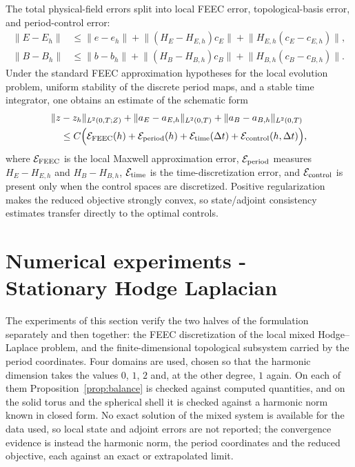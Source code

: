 \documentclass{article}
\newcommand{\norm}[1]{\lVert #1\rVert}
\begin{document}
The total physical-field errors split into local FEEC error, topological-basis error, and period-control error:
\begin{align}
  \norm{E-E_h}
  &\le \norm{e-e_h}
  +\norm{(H_E-H_{E,h})c_E}
  +\norm{H_{E,h}(c_E-c_{E,h})},
  \\
  \norm{B-B_h}
  &\le \norm{b-b_h}
  +\norm{(H_B-H_{B,h})c_B}
  +\norm{H_{B,h}(c_B-c_{B,h})}.
\end{align}
Under the standard FEEC approximation hypotheses for the local evolution problem, uniform stability of the discrete period maps, and a stable time integrator, one obtains an estimate of the schematic form
\begin{equation}
\begin{aligned}
 &\norm{z-z_h}_{L^2(0,T;Z)}
 +\norm{a_E-a_{E,h}}_{L^2(0,T)}
 +\norm{a_B-a_{B,h}}_{L^2(0,T)}\\
 &\quad\le C\Big(
   \mathcal E_{\rm FEEC}(h)
  +\mathcal E_{\rm period}(h)
  +\mathcal E_{\rm time}(\Delta t)
  +\mathcal E_{\rm control}(h,\Delta t)
 \Big),
\end{aligned}
\end{equation}
where $\mathcal E_{\rm FEEC}$ is the local Maxwell approximation error, $\mathcal E_{\rm period}$ measures $H_E-H_{E,h}$ and $H_B-H_{B,h}$, $\mathcal E_{\rm time}$ is the time-discretization error, and $\mathcal E_{\rm control}$ is present only when the control spaces are discretized.  Positive regularization makes the reduced objective strongly convex, so state/adjoint consistency estimates transfer directly to the optimal controls.

\section{Numerical experiments - Stationary Hodge Laplacian}\label{sec:numerics}

The experiments of this section verify the two halves of the formulation
separately and then together: the FEEC discretization of the local mixed
Hodge--Laplace problem, and the finite-dimensional topological subsystem
carried by the period coordinates. Four domains are used, chosen so that the
harmonic dimension takes the values $0$, $1$, $2$ and, at the other degree,
$1$ again. On each of them Proposition~\ref{prop:balance} is checked against
computed quantities, and on the solid torus and the spherical shell it is
checked against a harmonic norm known in closed form. No exact solution of the
mixed system is available for the data used, so local state and adjoint errors
are not reported; the convergence evidence is instead the harmonic norm, the
period coordinates and the reduced objective, each against an exact or
extrapolated limit.
\end{document}
